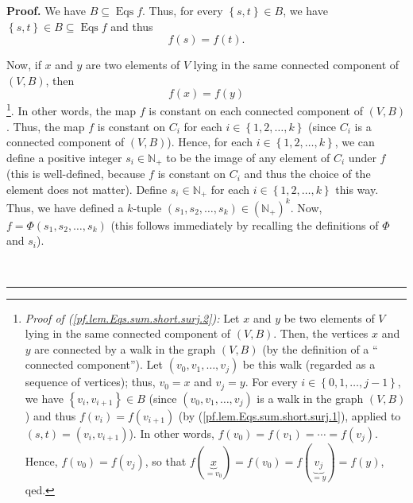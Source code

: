 \documentclass[numbers=enddot,12pt,final,onecolumn,notitlepage]{scrartcl}%
\theoremstyle{definition}
\newenvironment{proof}[1][Proof]{\noindent\textbf{#1.} }{\ \rule{0.5em}{0.5em}}
\newenvironment{vershort}{}{}
\begin{document}
\begin{vershort}
\begin{proof}
We have $B\subseteq\operatorname*{Eqs}f$. Thus, for every $\left\{
s,t\right\}  \in B$, we have $\left\{  s,t\right\}  \in B\subseteq
\operatorname*{Eqs}f$ and thus%
\begin{equation}
f\left(  s\right)  =f\left(  t\right)  . \label{pf.lem.Eqs.sum.short.surj.1}%
\end{equation}


Now, if $x$ and $y$ are two elements of $V$ lying in the same connected
component of $\left(  V,B\right)  $, then%
\begin{equation}
f\left(  x\right)  =f\left(  y\right)  \label{pf.lem.Eqs.sum.short.surj.2}%
\end{equation}
\footnote{\textit{Proof of (\ref{pf.lem.Eqs.sum.short.surj.2}):} Let $x$ and
$y$ be two elements of $V$ lying in the same connected component of $\left(
V,B\right)  $. Then, the vertices $x$ and $y$ are connected by a walk in the
graph $\left(  V,B\right)  $ (by the definition of a \textquotedblleft
connected component\textquotedblright). Let $\left(  v_{0},v_{1},\ldots
,v_{j}\right)  $ be this walk (regarded as a sequence of vertices); thus,
$v_{0}=x$ and $v_{j}=y$. For every $i\in\left\{  0,1,\ldots,j-1\right\}  $, we
have $\left\{  v_{i},v_{i+1}\right\}  \in B$ (since $\left(  v_{0}%
,v_{1},\ldots,v_{j}\right)  $ is a walk in the graph $\left(  V,B\right)  $)
and thus $f\left(  v_{i}\right)  =f\left(  v_{i+1}\right)  $ (by
(\ref{pf.lem.Eqs.sum.short.surj.1}), applied to $\left(  s,t\right)  =\left(
v_{i},v_{i+1}\right)  $). In other words, $f\left(  v_{0}\right)  =f\left(
v_{1}\right)  =\cdots=f\left(  v_{j}\right)  $. Hence, $f\left(  v_{0}\right)
=f\left(  v_{j}\right)  $, so that $f\left(  \underbrace{x}_{=v_{0}}\right)
=f\left(  v_{0}\right)  =f\left(  \underbrace{v_{j}}_{=y}\right)  =f\left(
y\right)  $, qed.}. In other words, the map $f$ is constant on each connected
component of $\left(  V,B\right)  $. Thus, the map $f$ is constant on $C_{i}$
for each $i\in\left\{  1,2,\ldots,k\right\}  $ (since $C_{i}$ is a connected
component of $\left(  V,B\right)  $). Hence, for each $i\in\left\{
1,2,\ldots,k\right\}  $, we can define a positive integer $s_{i}\in
\mathbb{N}_{+}$ to be the image of any element of $C_{i}$ under $f$ (this is
well-defined, because $f$ is constant on $C_{i}$ and thus the choice of the
element does not matter). Define $s_{i}\in\mathbb{N}_{+}$ for each
$i\in\left\{  1,2,\ldots,k\right\}  $ this way. Thus, we have defined a
$k$-tuple $\left(  s_{1},s_{2},\ldots,s_{k}\right)  \in\left(  \mathbb{N}%
_{+}\right)  ^{k}$. Now, $f=\Phi\left(  s_{1},s_{2},\ldots,s_{k}\right)  $
(this follows immediately by recalling the definitions of $\Phi$ and $s_{i}$).


\end{proof}
\end{vershort}
\end{document}
